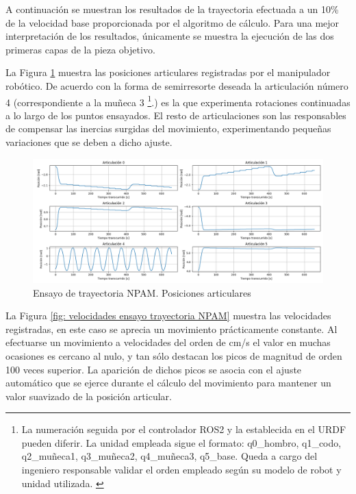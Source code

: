 A continuación se muestran los resultados de la trayectoria efectuada a un 10\% de la velocidad base proporcionada por el algoritmo de cálculo. Para una mejor interpretación de los resultados, únicamente se muestra la ejecución de las dos primeras capas de la pieza objetivo.

La Figura \ref{fig: posiciones ensayo trayectoria NPAM} muestra las posiciones articulares registradas por el manipulador robótico. De acuerdo con la forma de semirresorte deseada la articulación número 4 (correspondiente a la muñeca 3 \footnote{La numeración seguida por el controlador ROS2 y la establecida en el \acrshort{URDF} pueden diferir. La unidad empleada sigue el formato: q0\_hombro, q1\_codo, q2\_muñeca1, q3\_muñeca2, q4\_muñeca3, q5\_base. Queda a cargo del ingeniero responsable validar el orden empleado según su modelo de robot y unidad utilizada. \label{note: Aclaración número articulacionres ROS2}}.) es la que experimenta rotaciones continuadas a lo largo de los puntos ensayados. El resto de articulaciones son las responsables de compensar las inercias surgidas del movimiento, experimentando pequeñas variaciones que se deben a dicho ajuste.

\begin{figure}[h!]
    \centering
    \includegraphics[scale=0.40]{figuras/ensayo_trayectorias/posicones escala 0.1.png}
    \caption{Ensayo de trayectoria \acrshort{NPAM}. Posiciones articulares}
    \label{fig: posiciones ensayo trayectoria NPAM}
\end{figure}

La Figura \ref{fig: velocidades ensayo trayectoria NPAM} muestra las velocidades registradas, en este caso se aprecia un movimiento prácticamente constante. Al efectuarse un movimiento a velocidades del orden de cm/s el valor en muchas ocasiones es cercano al nulo, y tan sólo destacan los picos de magnitud de orden 100 veces superior. La aparición de dichos picos se asocia con el ajuste automático que se ejerce durante el cálculo del movimiento para mantener un valor suavizado de la posición articular.

